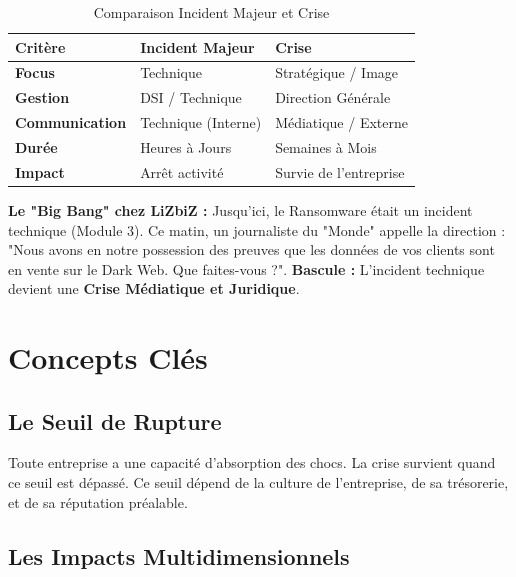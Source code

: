 \begin{table}[htbp]
\centering
\begin{tabular}{p{4cm}p{4cm}p{4cm}}
    \toprule
    \textbf{Critère} & \textbf{Incident Majeur} & \textbf{Crise} \\
    \midrule
    \textbf{Focus} & Technique & Stratégique / Image \\
    \textbf{Gestion} & DSI / Technique & Direction Générale \\
    \textbf{Communication} & Technique (Interne) & Médiatique / Externe \\
    \textbf{Durée} & Heures à Jours & Semaines à Mois \\
    \textbf{Impact} & Arrêt activité & Survie de l'entreprise \\
    \bottomrule
\end{tabular}
\caption{Comparaison Incident Majeur et Crise}
\end{table}

\begin{boxlizbiz}
\textbf{Le "Big Bang" chez LiZbiZ :}
Jusqu'ici, le Ransomware était un incident technique (Module 3).
Ce matin, un journaliste du "Monde" appelle la direction : "Nous avons en notre possession des preuves que les données de vos clients sont en vente sur le Dark Web. Que faites-vous ?".
\textbf{Bascule :} L'incident technique devient une \textbf{Crise Médiatique et Juridique}.
\end{boxlizbiz}

\section{Concepts Clés}

\subsection{Le Seuil de Rupture}

Toute entreprise a une capacité d'absorption des chocs. La crise survient quand ce seuil est dépassé.
Ce seuil dépend de la culture de l'entreprise, de sa trésorerie, et de sa réputation préalable.

\subsection{Les Impacts Multidimensionnels}

